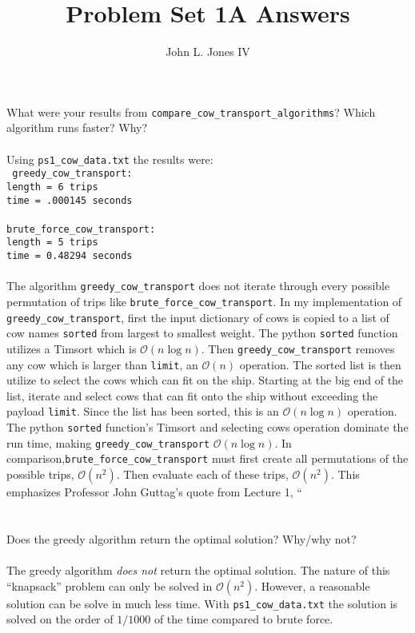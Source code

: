 \documentclass[letterpaper,11pt]{article}
\begin{document}
\title{Problem Set 1A Answers}
\author{John L. Jones IV}
\maketitle
\pagebreak

\section{}
What were your results from \texttt{compare\_cow\_transport\_algorithms}? Which algorithm runs faster? Why? \\
\\
Using \texttt{ps1\_cow\_data.txt} the results were: \\
\texttt{
  greedy\_cow\_transport:\\
  length =  6 trips \\
  time = .000145 seconds \\
  \\
  brute\_force\_cow\_transport: \\
  length =  5 trips \\
  time = 0.48294 seconds \\
}
\\
The algorithm \texttt{greedy\_cow\_transport} does not iterate through every possible permutation of trips
like \texttt{brute\_force\_cow\_transport}.
In my implementation of \texttt{greedy\_cow\_transport}, first the input dictionary of cows is copied to a 
list of cow names \texttt{sorted} from largest to smallest weight. 
The python \texttt{sorted} function utilizes a Timsort which is $\mathcal{O}(n\log{}n)$.
Then \texttt{greedy\_cow\_transport} removes any cow which is larger than \texttt{limit},
an $\mathcal{O}(n)$ operation. 
The sorted list is then utilize to select the cows which can fit on the ship.
Starting at the big end of the list,
iterate and select cows that can fit onto the ship without exceeding the payload \texttt{limit}.
Since the list has been sorted, this is an $\mathcal{O}(n\log{}n)$ operation.
The python \texttt{sorted} function's Timsort and 
selecting cows operation dominate the run time,
making \texttt{greedy\_cow\_transport} $\mathcal{O}(n\log{}n)$.
In comparison,\texttt{brute\_force\_cow\_transport} must first create all permutations of the possible trips, 
$\mathcal{O}(n^{2})$.
Then evaluate each of these trips, $\mathcal{O}(n^{2})$.
This emphasizes Professor John Guttag's quote from Lecture 1, ``

\section{}
Does the greedy algorithm return the optimal solution? Why/why not? \\
\\
The greedy algorithm \emph{does not} return the optimal solution.
The nature of this ``knapsack'' problem can only be solved in $\mathcal{O}(n^{2})$.
However, a reasonable solution can be solve in much less time.
With \texttt{ps1\_cow\_data.txt} the solution is solved on the order of $1/1000$ of the time compared to brute force.
\end{document}
